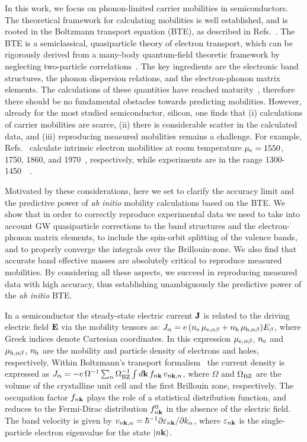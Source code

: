 \documentclass[aps,prl,twocolumn,superscriptaddress]{revtex4-1}
\begin{document}
In this work, we focus on  
phonon-limited carrier mobilities in semiconductors. The theoretical framework for calculating mobilities is 
well established, and is rooted in the Boltzmann transport equation (BTE), as described in 
Refs.~\cite{Ziman1960,Grimvall1981, Mahan2000}. The BTE is a semiclassical, quasiparticle theory of 
electron transport, which can be rigorously derived from a many-body quantum-field theoretic framework by 
neglecting two-particle correlations~\cite{Kadanoff1962}. The key ingredients are the electronic band 
structures, the phonon dispersion relations, and the electron-phonon matrix elements. The calculations 
of these quantities have reached maturity~\cite{Giustino2017}, therefore 
there should be no fundamental obstacles towards predicting mobilities. However, already for the most 
studied semiconductor, silicon, one finds that (i) calculations of carrier 
mobilities are scarce, (ii) there is considerable scatter in the calculated data, and (iii) reproducing 
measured mobilities remains a challenge. For example, Refs.~
 calculate intrinsic electron mobilities at room temperature $\mu_{\rm e}=1550$, 
1750, 1860, and 1970~\mobun, respectively, while experiments are in the range 1300-1450~\mobun\ 
\cite{Canali1975,Norton1973,Sze2007}.

Motivated by these considerations, here we set to clarify the accuracy limit and the predictive
power of {\it ab initio} mobility calculations based on the BTE. We show that in order to correctly
reproduce experimental data we need to take into account GW quasiparticle corrections to the band structures
and the electron-phonon matrix elements, to include the spin-orbit splitting of the valence bands, and to properly converge the integrals over the Brillouin-zone. We also find that accurate band effective masses are absolutely critical to
reproduce measured mobilities. By considering all these aspects, we succeed in reproducing measured 
data with high accuracy, thus establishing unambiguously the predictive power of the {\it ab initio} BTE.

In a semiconductor the steady-state electric current ${\bf J}$ is related to the driving electric field
${\bf E}$ via the mobility tensors as: $J_{\alpha} = e \,(n_{\rm e} \,\mu_{{\rm e},{\alpha}{\beta}} + n_{\rm h} 
\,\mu_{{\rm h},{\alpha}{\beta}}) E_{\beta}$, where Greek indices denote Cartesian coordinates.
In this expression $\mu_{{\rm e},{\alpha}{\beta}}$, $n_{\rm e}$ and $\mu_{{\rm h},{\alpha}{\beta}}$, $n_{\rm h}$ are the 
mobility and particle density of electrons and holes, respectively.
Within Boltzmann's transport formalism~\cite{Ziman1960} the current density is expressed as 
$J_{\alpha} = -e \,\Omega^{-1} \sum_n \Omega_{\rm BZ}^{-1}\int d{\bf k} \, f_{n{\bf k}} \,v_{n{\bf k},{\alpha}}$, where
$\Omega$ and $\Omega_{\rm BZ}$ are the volume of the crystalline
unit cell and the first Brillouin zone, respectively. The occupation factor $f_{n{\bf k}}$ plays the role 
of a statistical distribution function, and reduces to the Fermi-Dirac distribution $f^0_{n{\bf k}}$ in the 
absence of the electric field. The band velocity is given by $v_{n{\bf k},{\alpha}} = \hbar^{-1}\partial {\varepsilon}_{n{\bf k}}/\partial k_{\alpha}$, 
where ${\varepsilon}_{n{\bf k}}$ is the single-particle electron eigenvalue for the state $|n{\bf k}\rangle$. 
\end{document}
